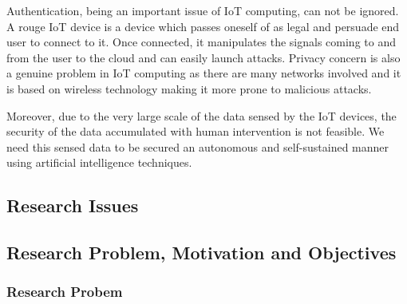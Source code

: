 \documentclass[10pt]{llncs}
\begin{document}
Authentication, being an important issue of IoT computing, can not be ignored. A rouge IoT device is a device which passes oneself of as legal and persuade end user to connect to it. Once connected, it manipulates the signals coming to and from the user to the cloud and can easily launch attacks. Privacy concern is also a genuine problem in IoT computing as there are many networks involved and it is based on wireless technology making it more prone to malicious attacks.

Moreover, due to the very large scale of the data sensed by the IoT devices, the security of the data accumulated with human intervention is not feasible. We need this sensed data to be secured an autonomous and self-sustained manner using artificial intelligence techniques. 

%

%

%

%


%
\subsection{Research Issues}


%


%


%


%
\subsection{Research Problem, Motivation and Objectives}

%
\subsubsection{Research Probem}

\end{document}
